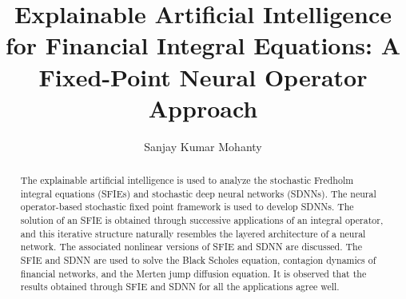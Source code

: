 \documentclass[preprint,12pt,authoryear]{elsarticle}
\begin{document}
\begin{frontmatter}



\title{Explainable Artificial Intelligence for Financial Integral Equations: A Fixed-Point Neural Operator Approach} %


\author[1]{Sanjay Kumar Mohanty}

\begin{abstract}
The explainable artificial intelligence is used to analyze the stochastic Fredholm integral equations (SFIEs) and stochastic
deep neural networks (SDNNs). The neural operator-based stochastic fixed point framework is used to develop SDNNs. The solution of an SFIE is obtained
through successive applications of an integral operator, and this iterative structure naturally
resembles the layered architecture of a neural network. The associated nonlinear versions of SFIE and SDNN are discussed. The SFIE and SDNN are used to solve the Black Scholes equation, contagion dynamics of financial networks, and the Merten jump diffusion equation. It is observed that the results obtained through SFIE and SDNN for all the applications agree well. 
\end{abstract}


\end{frontmatter}
\end{document}
